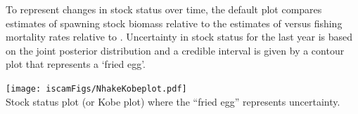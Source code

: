 \begin{multicols}{2}
To represent changes in stock status over time, the default plot compares estimates of spawning stock biomass relative to the estimates of \bmsy versus fishing mortality rates relative to \fmsy.  Uncertainty in stock status for the last year is based on the joint posterior distribution and a credible interval is given by a contour plot that represents a `fried egg'.

\begin{figurehere}
	\centering
	\texttt{[image: iscamFigs/NhakeKobeplot.pdf]}\\
	\caption{Stock status plot (or Kobe plot) where the ``fried egg'' represents uncertainty.}\label{fig7}
\end{figurehere}

\end{multicols}



